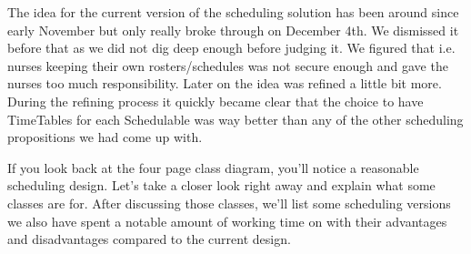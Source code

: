 \documentclass[11pt]{article}
\begin{document}
The idea for the current version of the scheduling solution has been around since early November but only really broke through on December 4th. We dismissed it before that as we did not dig deep enough before judging it. We figured that i.e. nurses keeping their own rosters/schedules was not secure enough and gave the nurses too much responsibility. Later on the idea was refined a little bit more. During the refining process it quickly became clear that the choice to have TimeTables for each Schedulable was way better than any of the other scheduling propositions we had come up with.

If you look back at the four page class diagram, you'll notice a reasonable scheduling design. Let's take a closer look right away and explain what some classes are for. After discussing those classes, we'll list some scheduling versions we also have spent a notable amount of working time on with their advantages and disadvantages compared to the current design.
\end{document}

